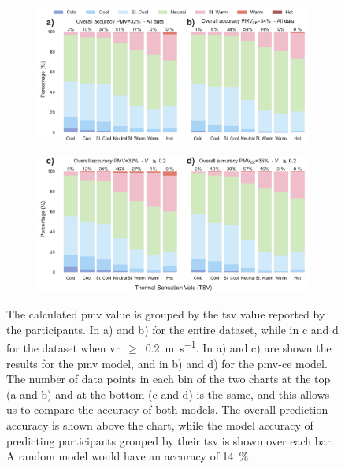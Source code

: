 \begin{figure}[htb!]
    \centering
    \begin{subfigure}[b]{\textwidth}
        \centering
        \includegraphics[width=\textwidth]{figures/bar_stacked_model_accuracy_0}
    \end{subfigure}
    \par\bigskip %
    \begin{subfigure}[b]{\textwidth}
        \centering
        \includegraphics[width=\textwidth]{figures/bar_stacked_model_accuracy_0.2}
    \end{subfigure}
    \caption{The calculated \ac{pmv} value is grouped by the \ac{tsv} value reported by the participants.
    In a) and b) for the entire dataset, while in c and d for the dataset when \ac{vr}~$\geq$~\qty{0.2}{\m\per\s}.
    In a) and c) are shown the results for the \ac{pmv} model, and in b) and d) for the \ac{pmv-ce} model.
    The number of data points in each bin of the two charts at the top (a and b) and at the bottom (c and d) is the same, and this allows us to compare the accuracy of both models.
    The overall prediction accuracy is shown above the chart, while the model accuracy of predicting participants grouped by their \ac{tsv} is shown over each bar.
    A random model would have an accuracy of \qty{14}{\percent}.}
    \label{fig:bar_stacked_model_accuracy}
\end{figure}
